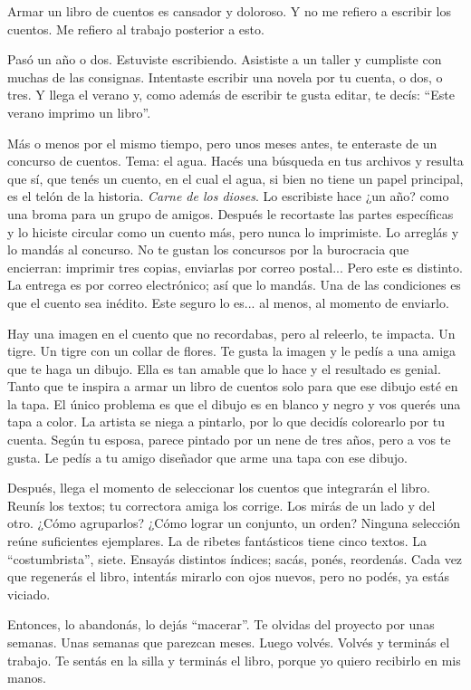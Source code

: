 \documentclass[11pt,twoside,openright]{book}
\begin{document}
\begin{em} Armar un libro de cuentos es cansador y doloroso. Y no me refiero a
escribir los cuentos. Me refiero al trabajo posterior a esto.

Pasó un año o dos. Estuviste escribiendo. Asististe a un taller y cumpliste con
muchas de las consignas. Intentaste escribir una novela por tu cuenta, o dos, o
tres. Y llega el verano y, como además de escribir te gusta editar, te decís:
“Este verano imprimo un libro”.

Más o menos por el mismo tiempo, pero unos meses antes, te enteraste de un
concurso de cuentos. Tema: el agua. Hacés una búsqueda en tus archivos y
resulta que sí, que tenés un cuento, en el cual el agua, si bien no tiene un
papel principal, es el telón de la historia. \emph{Carne de los dioses}. Lo
escribiste hace ¿un año? como una broma para un grupo de amigos. Después le
recortaste las partes específicas y lo hiciste circular como un cuento más,
pero nunca lo imprimiste. Lo arreglás y lo mandás al concurso. No te gustan los
concursos por la burocracia que encierran: imprimir tres copias, enviarlas por
correo postal... Pero este es distinto. La entrega es por correo electrónico;
así que lo mandás. Una de las condiciones es que el cuento sea inédito. Este
seguro lo es... al menos, al momento de enviarlo.

Hay una imagen en el cuento que no recordabas, pero al releerlo, te impacta. Un
tigre. Un tigre con un collar de flores. Te gusta la imagen y le pedís a una
amiga que te haga un dibujo. Ella es tan amable que lo hace y el resultado es
genial. Tanto que te inspira a armar un libro de cuentos solo para que ese
dibujo esté en la tapa. El único problema es que el dibujo es en blanco y negro
y vos querés una tapa a color. La artista se niega a pintarlo, por lo que
decidís colorearlo por tu cuenta. Según tu esposa, parece pintado por un nene
de tres años, pero a vos te gusta. Le pedís a tu amigo diseñador que arme una
tapa con ese dibujo.

Después, llega  el momento de seleccionar los cuentos que integrarán el libro.
Reunís los textos; tu correctora amiga los corrige. Los mirás de un lado y del
otro. ¿Cómo agruparlos? ¿Cómo lograr un conjunto, un orden? Ninguna selección
reúne suficientes ejemplares. La de ribetes fantásticos tiene cinco textos. La
“costumbrista”, siete. Ensayás distintos índices; sacás, ponés, reordenás. Cada
vez que regenerás el libro, intentás mirarlo con ojos nuevos, pero no podés, ya
estás viciado.

Entonces, lo abandonás, lo dejás “macerar”. Te olvidas del proyecto por unas
semanas. Unas semanas que parezcan meses. Luego volvés. Volvés y terminás el
trabajo. Te sentás en la silla y terminás el libro, porque yo quiero recibirlo
en mis manos.

\end{em}
\end{document}
